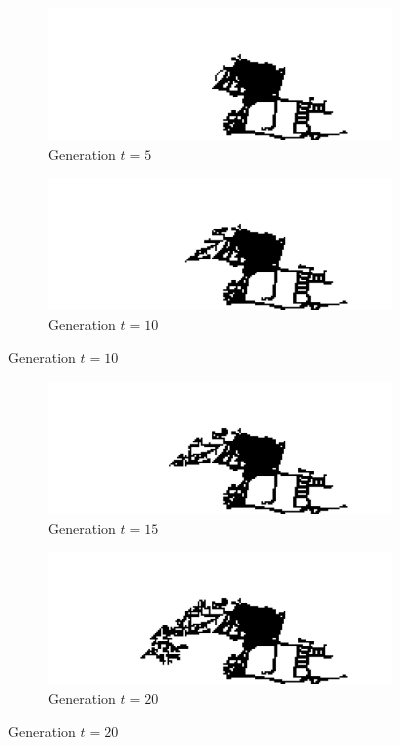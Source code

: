 \begin{figure}[H]
\begin{subfigure}{.5\textwidth}
  \centering
  \includegraphics[width=1\linewidth]{Figures/Chapter4/generation-5-melusi}
  \caption*{Generation $t = 5$}
\end{subfigure}
\begin{subfigure}{.5\textwidth}
  \centering
  \includegraphics[width=1\linewidth]{Figures/Chapter4/generation-10-melusi}
  \caption*{Generation $t = 10$}
\end{subfigure}
\end{figure}

\begin{figure}[H]
\begin{subfigure}{.5\textwidth}
  \centering
  \includegraphics[width=1\linewidth]{Figures/Chapter4/generation-15-melusi}
  \caption*{Generation $t = 15$}
\end{subfigure}
\begin{subfigure}{.5\textwidth}
  \centering
  \includegraphics[width=1\linewidth]{Figures/Chapter4/generation-20-melusi}
  \caption*{Generation $t = 20$}
\end{subfigure}
\end{figure}

